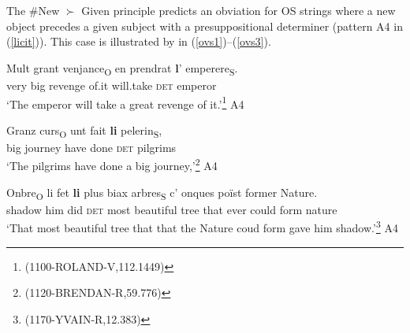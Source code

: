 \documentclass[output=paper,modfonts,nonflat]{langsci/langscibook}
\begin{document}

The \#New $\succ$ Given principle predicts an obviation for OS strings where a new object precedes a given subject with a presuppositional determiner (pattern A4 in (\ref{licit})). This case is illustrated by in (\ref{ovs1})--(\ref{ovs3}).

\ea
\gll Mult grant venjance\textsubscript{O} en prendrat {\bfseries l}' emperere\textsubscript{S}.\\
very big revenge of.it will.take {\scshape det} emperor\\
\glt  `The emperor will take a great revenge of it.'\footnote{ (1100-ROLAND-V,112.1449)}
\hfill A4
\z



\ea
\gll Granz curs\textsubscript{O} unt fait {\bfseries li} pelerin\textsubscript{S},\\
big journey have done {\scshape det} pilgrims\\
\glt  `The pilgrims have done a big journey,'\footnote{ (1120-BRENDAN-R,59.776)}\label{ovs2} \hfill A4
\z

\ea
\gll Onbre\textsubscript{O} li fet {\bfseries li} plus biax arbres\textsubscript{S} c' onques po\"{i}st former Nature.\\
shadow him did {\scshape det} most beautiful tree that ever could form nature\\
\glt  `That most beautiful tree that that the Nature coud form gave him shadow.'\footnote{ (1170-YVAIN-R,12.383)} \hfill A4
\z


\end{document}
